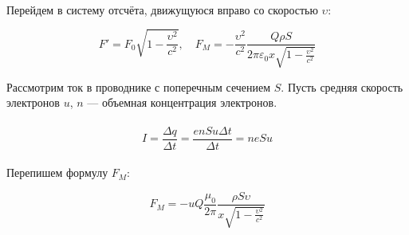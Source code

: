 \documentclass[dvipdfmx]{article}
\begin{document}
\paragraph{}

Перейдем в систему отсчёта, движущуюся вправо со скоростью $\upsilon$:

\begin{equation*}
  F' = F_0\sqrt{1-\frac{\upsilon^2}{c^2}}, \quad F_M = -\frac{\upsilon^2}{c^2}\frac{Q\rho S}
  {2\pi\varepsilon_0x\sqrt{1-\frac{\upsilon^2}{c^2}}}
\end{equation*}

\newpage

Рассмотрим ток в проводнике с поперечным сечением $S$. Пусть средняя скорость электронов $u$,
$n$ --- объемная концентрация электронов.

\paragraph{}
\noindent{}
\paragraph{}

\begin{equation*}
  I = \frac{\Delta q}{\Delta t} = \frac{enSu\Delta t}{\Delta t} = neSu
\end{equation*}
\paragraph{}

Перепишем формулу $F_M$:

\begin{equation*}
  F_M = -uQ\frac{\mu_0}{2\pi}\frac{\rho S\upsilon}{x\sqrt{1-\frac{\upsilon^2}{c^2}}}
\end{equation*}
\paragraph{}
\end{document}
